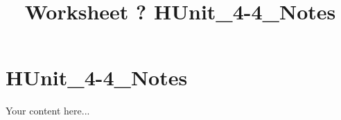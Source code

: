 \documentclass{article}
\title{Worksheet ? HUnit_4-4_Notes}
\begin{document}
\maketitle
\section*{HUnit_4-4_Notes}
Your content here...\\
\end{document}
